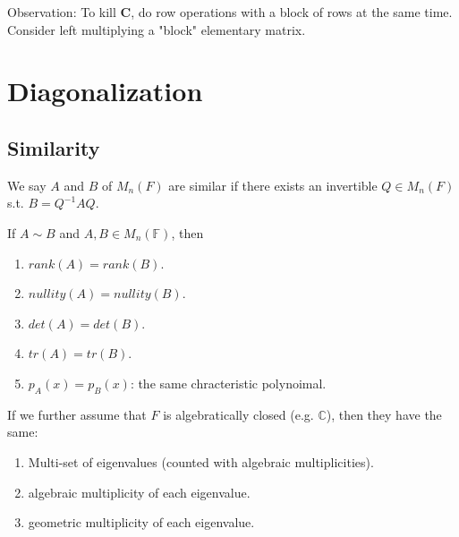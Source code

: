 \documentclass[12pt]{article}
\begin{document}
\begin{pf}
    Observation: To kill $\textbf{C}$, do row operations with a block of rows at the same time.
    Consider left multiplying a "block" elementary matrix.
\end{pf}

\newpage
\section{Diagonalization}
\subsection{Similarity}

\begin{definition}
    We say $A$ and $B$ of $M_n(F)$ are similar if there exists an invertible $Q\in M_n(F)$ s.t. $B=Q^{-1}AQ$.
\end{definition}


\begin{theorem}
    If $A\sim B$ and $A,B\in M_n(\mathbb{F})$, then
    \begin{enumerate}
        \item $rank(A)=rank(B)$.
        \item $nullity(A)=nullity(B)$.
        \item $det(A)=det(B)$.
        \item $tr(A)=tr(B)$.
        \item $p_A(x)=p_B(x)$: the same chracteristic polynoimal.
    \end{enumerate}

    If we further assume that $F$ is algebratically closed (e.g. $\mathbb{C}$), then they have the same:
    \begin{enumerate}
        \item Multi-set of eigenvalues (counted with algebraic multiplicities).
        \item algebraic multiplicity of each eigenvalue.
        \item geometric multiplicity of each eigenvalue.
    \end{enumerate}
\end{theorem}
\end{document}
